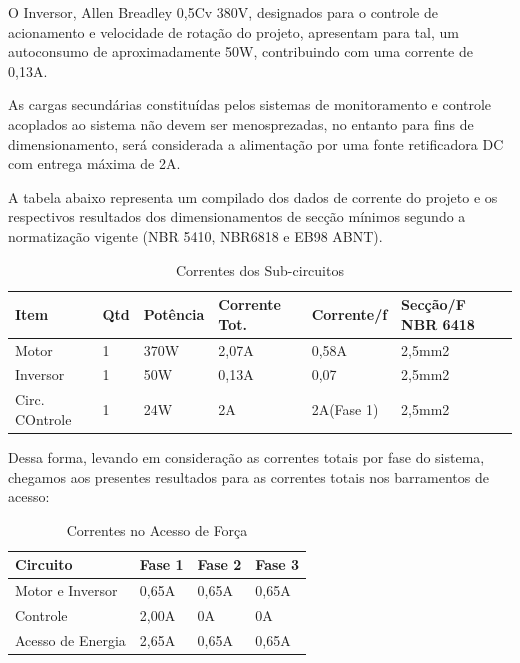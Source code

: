     O Inversor, Allen Breadley 0,5Cv 380V, designados para o controle de acionamento e velocidade de rotação do projeto, apresentam para tal, um autoconsumo de aproximadamente 50W, contribuindo com uma corrente de 0,13A.
    
    As cargas secundárias constituídas pelos sistemas de monitoramento e controle acoplados ao sistema não devem  ser menosprezadas, no entanto para fins de dimensionamento, será considerada a alimentação por uma fonte retificadora DC com entrega máxima de 2A.
    
    A tabela abaixo representa um compilado dos dados de corrente do projeto e os respectivos resultados dos dimensionamentos de secção mínimos segundo a normatização vigente (NBR 5410, NBR6818 e EB98 ABNT).
    
    \begin{table}[h]
	\centering
	\label{tab01}
	
	\begin{tabular}{llllll}
		\toprule
		\textbf{Item} & \textbf{Qtd} & 
        \textbf{Potência} & \textbf{Corrente Tot.}  & \textbf{Corrente/f}  & 
        \textbf{Secção/F NBR 6418} \\
		\midrule
		Motor & 1 & 370W & 2,07A & 0,58A & 2,5mm2 \\
		Inversor & 1 & 50W & 0,13A & 0,07 & 2,5mm2 \\
		Circ. COntrole & 1 & 24W & 2A & 2A(Fase 1) & 2,5mm2 \\
		\bottomrule
	\end{tabular}

	\caption{Correntes dos Sub-circuitos}
\end{table}

Dessa forma, levando em consideração as correntes totais por fase do sistema, chegamos aos presentes resultados para as correntes totais nos barramentos de acesso:

    \begin{table}[h]
	\centering
	\label{tab01}
	
	\begin{tabular}{llll}
		\toprule
		\textbf{Circuito} & \textbf{Fase 1} & \textbf{Fase 2} & \textbf{Fase 3}\\
		\midrule
		Motor e Inversor & 0,65A & 0,65A & 0,65A \\
		Controle & 2,00A & 0A & 0A \\
        Acesso de Energia & 2,65A & 0,65A & 0,65A \\
		\bottomrule
	\end{tabular}

	\caption{Correntes no Acesso de Força}
\end{table}

